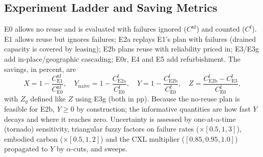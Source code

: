 \documentclass{article} %
\begin{document}
\subsection{Experiment Ladder and Saving Metrics}
\label{sec:method_ladder}
\label{sec:method_uq}
E0 allows no reuse and is evaluated with failures ignored ($C^{\text{nf}}$) and counted ($C^{\text{f}}$). E1 allows reuse but ignores failures; E2a replays E1's plan with failures (drained capacity is covered by leasing); E2b plans reuse with reliability priced in; E3/E3g add in-place/geographic cascading; E0r, E4 and E5 add refurbishment. The savings, in percent, are
\begin{equation}
X = 1-\frac{C^{\text{nf}}_{\text{E1}}}{C^{\text{nf}}_{\text{E0}}}, \quad
Y_{\text{naive}} = 1-\frac{C^{\text{f}}_{\text{E2a}}}{C^{\text{f}}_{\text{E0}}}, \quad
Y = 1-\frac{C^{\text{f}}_{\text{E2b}}}{C^{\text{f}}_{\text{E0}}}, \quad
Z = \frac{C^{\text{f}}_{\text{E2b}} - C^{\text{f}}_{\text{E3}}}{C^{\text{f}}_{\text{E0}}},
\label{eq:savings}
\end{equation}
with $Z_g$ defined like $Z$ using E3g (both in pp). Because the no-reuse plan is feasible for E2b, $Y \ge 0$ by construction; the informative quantities are how fast $Y$ decays and where it reaches zero. Uncertainty is assessed by one-at-a-time (tornado) sensitivity, triangular fuzzy factors on failure rates ($\times[0.5,1,3]$), embodied carbon ($\times[0.5,1,2]$) and the CXL multiplier ($[0.85,0.95,1.0]$) propagated to $Y$ by $\alpha$-cuts, and sweeps.
\end{document}
